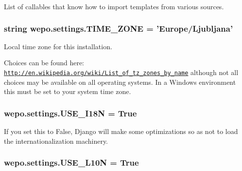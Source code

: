List of callables that know how to import templates from various sources. 

\hypertarget{namespacewepo_1_1settings_abf6070aa707faad2afddfb65cc6884a7}{
\subsubsection[{T\-I\-M\-E\-\_\-\-Z\-O\-N\-E}]{\setlength{\rightskip}{0pt plus 5cm}string wepo.\-settings.\-T\-I\-M\-E\-\_\-\-Z\-O\-N\-E = 'Europe/Ljubljana'}}\label{namespacewepo_1_1settings_abf6070aa707faad2afddfb65cc6884a7}


Local time zone for this installation. 

Choices can be found here\-: \href{http://en.wikipedia.org/wiki/List_of_tz_zones_by_name}{\tt http\-://en.\-wikipedia.\-org/wiki/\-List\-\_\-of\-\_\-tz\-\_\-zones\-\_\-by\-\_\-name} although not all choices may be available on all operating systems. In a Windows environment this must be set to your system time zone. \hypertarget{namespacewepo_1_1settings_a5f014d097a8a6dc725e7437b20342ef6}{
\subsubsection[{U\-S\-E\-\_\-\-I18\-N}]{\setlength{\rightskip}{0pt plus 5cm}wepo.\-settings.\-U\-S\-E\-\_\-\-I18\-N = True}}\label{namespacewepo_1_1settings_a5f014d097a8a6dc725e7437b20342ef6}


If you set this to False, Django will make some optimizations so as not to load the internationalization machinery. 

\hypertarget{namespacewepo_1_1settings_a397833200b8371e543b3320b2ff94536}{
\subsubsection[{U\-S\-E\-\_\-\-L10\-N}]{\setlength{\rightskip}{0pt plus 5cm}wepo.\-settings.\-U\-S\-E\-\_\-\-L10\-N = True}}\label{namespacewepo_1_1settings_a397833200b8371e543b3320b2ff94536}


